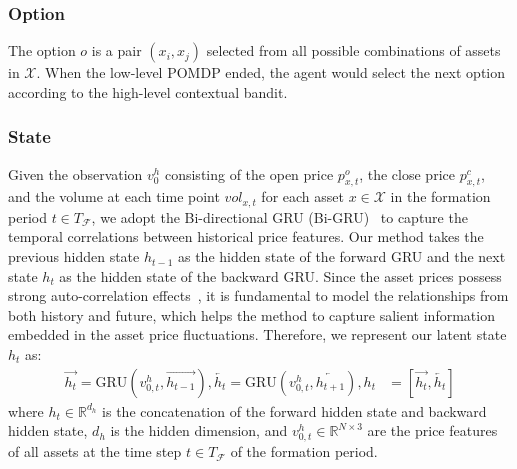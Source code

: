\documentclass[sigconf]{acmart}
\begin{document}
\subsubsection{Option}
The option $o$ is a pair $(x_i, x_j)$ selected from all possible combinations of assets in $\mathcal{X}$.
When the low-level POMDP ended, the agent would select the next option according to the high-level contextual bandit.

\subsubsection{State}
Given the observation $v^h_0$ consisting of the open price $p^o_{x,t}$, the close price $p^c_{x,t}$, and the volume at each time point $vol_{x,t}$ for each asset $x \in \mathcal{X}$ in the formation period $t \in T_{\mathcal{F}}$,
we adopt the Bi-directional GRU (Bi-GRU)~\cite{hochreiter1997long} to capture the temporal correlations between historical price features.
Our method takes the previous hidden state $h_{t-1}$ as the hidden state of the forward GRU and the next state $h_{t}$ as the hidden state of the backward GRU.
Since the asset prices possess strong auto-correlation effects~\cite{10.1093/jjfinec/nbaa033}, it is fundamental to model the relationships from both history and future, which helps the method to capture salient information embedded in the asset price fluctuations.
Therefore, we represent our latent state $h_t$ as:
\begin{equation}
 \begin{split}
 \overrightarrow{h_t} = \text{GRU}(v^h_{0, t}, \overrightarrow{h_{t-1}}),\overleftarrow{h_t} = \text{GRU}(v^h_{0, t}, \overleftarrow{h_{t+1}}), h_t &= [\overrightarrow{h_t},\overleftarrow{h_t}]
 \end{split}
\end{equation}
where $h_t \in \mathbb{R}^{d_h}$ is the concatenation of the forward hidden state and backward hidden state, ${d_h}$ is the hidden dimension, and $v^h_{0, t} \in \mathbb{R}^{N \times 3}$ are the price features of all assets at the time step $t \in T_\mathcal{F}$ of the formation period.
\end{document}
